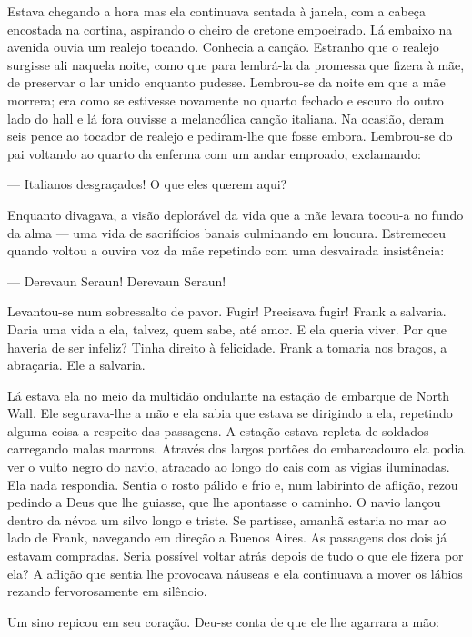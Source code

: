 Estava chegando a hora mas ela continuava sentada à janela, com a
cabeça encostada na cortina, aspirando o cheiro de cretone empoeirado.
Lá embaixo na avenida ouvia um realejo tocando. Conhecia a canção.
Estranho que o realejo surgisse ali naquela noite, como que para
lembrá-la da promessa que fizera à mãe, de preservar o lar unido
enquanto pudesse. Lembrou-se da noite em que a mãe morrera; era como
se estivesse novamente no quarto fechado e escuro do outro lado do
hall e lá fora ouvisse a melancólica canção italiana. Na ocasião,
deram seis pence ao tocador de realejo e pediram-lhe que fosse embora.
Lembrou-se do pai voltando ao quarto da enferma com um andar
emproado, exclamando:

--- Italianos desgraçados! O que eles querem aqui?

Enquanto divagava, a visão deplorável da vida que a mãe levara tocou-a
no fundo da alma --- uma vida de sacrifícios banais culminando em
loucura. Estremeceu quando voltou a ouvira voz da mãe repetindo com
uma desvairada insistência:

--- Derevaun Seraun! Derevaun Seraun!

Levantou-se num sobressalto de pavor. Fugir! Precisava fugir! Frank a
salvaria. Daria uma vida a ela, talvez, quem sabe, até amor. E ela
queria viver. Por que haveria de ser infeliz? Tinha direito à
felicidade. Frank a tomaria nos braços, a abraçaria. Ele a salvaria.

\dotfill\hspace{.7\textwidth}

Lá estava ela no meio da multidão ondulante na estação de embarque de
North Wall. Ele segurava-lhe a mão e ela sabia que estava se dirigindo
a ela, repetindo alguma coisa a respeito das passagens. A estação
estava repleta de soldados carregando malas marrons. Através dos
largos portões do embarcadouro ela podia ver o vulto negro do navio,
atracado ao longo do cais com as vigias iluminadas. Ela nada
respondia. Sentia o rosto pálido e frio e, num labirinto de aflição,
rezou pedindo a Deus que lhe guiasse, que lhe apontasse o caminho. O
navio lançou dentro da névoa um silvo longo e triste. Se partisse,
amanhã estaria no mar ao lado de Frank, navegando em direção a Buenos
Aires. As passagens dos dois já estavam compradas. Seria possível
voltar atrás depois de tudo o que ele fizera por ela? A aflição que
sentia lhe provocava náuseas e ela continuava a mover os lábios
rezando fervorosamente em silêncio.

Um sino repicou em seu coração. Deu-se conta de que ele lhe agarrara a
mão:

